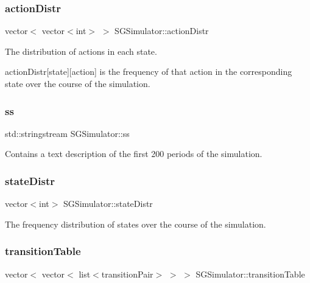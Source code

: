 \subsubsection{\texorpdfstring{action\+Distr}{actionDistr}}
{\footnotesize\ttfamily vector$<$ vector$<$int$>$ $>$ S\+G\+Simulator\+::action\+Distr\hspace{0.3cm}{\ttfamily [private]}}



The distribution of actions in each state. 

action\+Distr\mbox{[}state\mbox{]}\mbox{[}action\mbox{]} is the frequency of that action in the corresponding state over the course of the simulation. \mbox{\label{classSGSimulator_af2f15fbb5e900408947007367b650153}} 
\subsubsection{\texorpdfstring{ss}{ss}}
{\footnotesize\ttfamily std\+::stringstream S\+G\+Simulator\+::ss\hspace{0.3cm}{\ttfamily [private]}}

Contains a text description of the first 200 periods of the simulation. \mbox{\label{classSGSimulator_ac66b6cef3d8ea07e3385b50f827216cf}} 
\subsubsection{\texorpdfstring{state\+Distr}{stateDistr}}
{\footnotesize\ttfamily vector$<$int$>$ S\+G\+Simulator\+::state\+Distr\hspace{0.3cm}{\ttfamily [private]}}

The frequency distribution of states over the course of the simulation. \mbox{\label{classSGSimulator_a07d836b7d8fdcb2d07731f8c51505522}} 
\subsubsection{\texorpdfstring{transition\+Table}{transitionTable}}
{\footnotesize\ttfamily vector$<$ vector$<$ list$<$transition\+Pair$>$ $>$ $>$ S\+G\+Simulator\+::transition\+Table\hspace{0.3cm}{\ttfamily [private]}}



